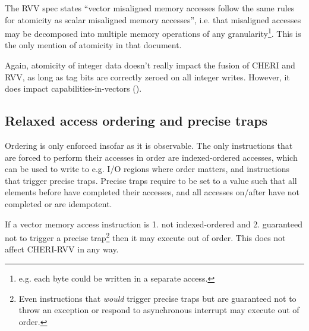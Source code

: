 The RVV spec states \enquote{vector misaligned memory accesses follow the same rules for atomicity as scalar misaligned memory accesses}, i.e. that misaligned accesses may be decomposed into multiple memory operations of any granularity\footnote{e.g. each byte could be written in a separate access.}.
This is the only mention of atomicity in that document.

Again, atomicity of integer data doesn't really impact the fusion of CHERI and RVV, as long as tag bits are correctly zeroed on all integer writes.
However, it does impact capabilities-in-vectors ().

\subsection{Relaxed access ordering and precise traps}
Ordering is only enforced insofar as it is observable.
The only instructions that are forced to perform their accesses in order are indexed-ordered accesses, which can be used to write to e.g. I/O regions where order matters, and instructions that trigger precise traps.
Precise traps require  to be set to a value such that all elements before  have completed their accesses, and all accesses on/after  have not completed or are idempotent.

If a vector memory access instruction is 1. not indexed-ordered and 2. guaranteed not to trigger a precise trap\footnote{Even instructions that \emph{would} trigger precise traps but are guaranteed not to throw an exception or respond to asynchronous interrupt may execute out of order.} then it may execute out of order.
This does not affect CHERI-RVV in any way.